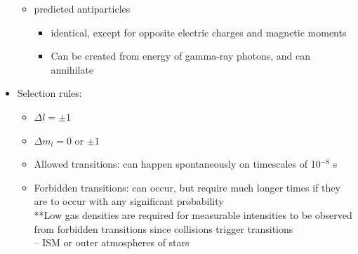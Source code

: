 \documentclass[12pt]{article}
\begin{document}
\begin{itemize}
\begin{itemize}
\item predicted antiparticles
\begin{itemize}
\item identical, except for opposite electric charges and magnetic moments
\item Can be created from energy of gamma-ray photons, and can annihilate
\end{itemize}
\end{itemize}
\item Selection rules:
\begin{itemize}
\item $\Delta l = \pm 1$
\item $\Delta m_l = 0$ or $\pm 1$
\end{itemize}
\begin{itemize}
\item Allowed transitions: can happen spontaneously on timescales of 10$^{-8}$ s
\item Forbidden transitions: can occur, but require much longer times if they are to occur with any significant probability
\\ **Low gas densities are required for measurable intensities to be observed from forbidden transitions since collisions trigger transitions
\\ -- ISM or outer atmospheres of stars
\end{itemize}
\end{itemize}
\end{document}
